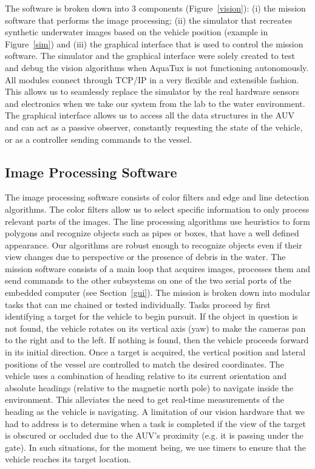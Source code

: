 The software is broken down into 3
components (Figure~\ref{vision}): (i) the mission software that performs the image
processing; (ii) the simulator that recreates synthetic underwater
images based on the vehicle position (example in
Figure~\ref{sim}) and (iii) the graphical interface that is used to
control the mission software. The simulator and the graphical
interface were solely created to test and debug the vision
algorithms when AquaTux is not functioning autonomously. All modules connect through TCP/IP in a
very flexible and extensible fashion. This allows us to seamlessly
replace the simulator by the real hardware sensors and electronics
when we take our system from the lab to the water environment. The
graphical interface allows us to access all the data structures in the
AUV and can act as a passive observer, constantly requesting the
state of the vehicle, or as a controller sending commands to the
vessel.



\vspace{-.1in}
\subsection{Image Processing Software}
The image processing software consists of color filters and edge and
line detection algorithms. The color filters allow us to select
specific information to only process relevant parts of the images. The
line processing algorithms use heuristics to form polygons and
recognize objects such as pipes or boxes, that have a well defined
appearance. Our algorithms are robust enough to recognize objects even
if their view changes due to perspective or the presence of debris in
the water.  The mission software consists of a main loop that acquires
images, processes them and send commands to the other subsystems on
one of the two serial ports of the embedded computer (see
Section~\ref{gui}). The mission is broken down into modular tasks that
can me chained or tested individually. Tasks proceed by first
identifying a target for the vehicle to begin pursuit. If the object
in question is not found, the vehicle rotates on its vertical axis
(yaw) to make the cameras pan to the right and to the left. If nothing
is found, then the vehicle proceeds forward in its initial direction.
Once a target is acquired, the vertical position and lateral positions
of the vessel are controlled to match the desired coordinates.  The
vehicle uses a combination of heading relative to its current
orientation and absolute headings (relative to the magnetic north
pole) to navigate inside the environment. This alleviates the need to
get real-time measurements of the heading as the vehicle is
navigating. A limitation of our vision hardware that we had to address
is to determine when a task is completed if the view of the target is
obscured or occluded due to the AUV's proximity (e.g. it is passing
under the gate). In such situations, for the moment being, we use
timers to ensure that the vehicle reaches its target location.
